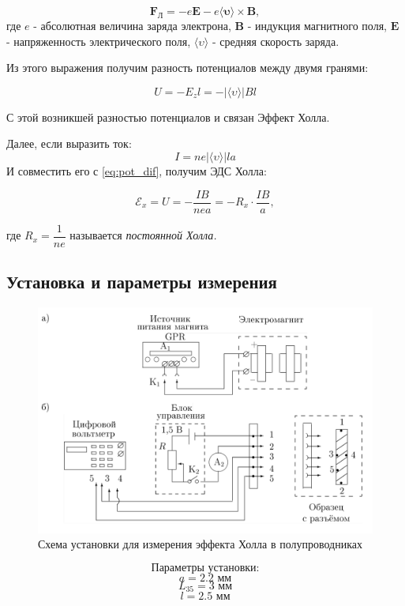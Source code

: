 \documentclass[a4paper, 12pt]{article}
\begin{document}
$$\boldsymbol{F_\text{Л}}  = -e \boldsymbol{E} - e \langle \boldsymbol{\upsilon} \rangle \times \boldsymbol{B},$$
где $e$ - абсолютная величина заряда электрона, $\boldsymbol{B}$ - индукция магнитного поля, $\boldsymbol{E}$ - напряженность электрического поля, $ \langle \upsilon \rangle$ - средняя скорость заряда.

Из этого выражения получим разность потенциалов между двумя гранями:

\begin{equation}
U = -E_zl = - | \langle \upsilon \rangle | B l
\label{eq:pot_dif}
\end{equation}

С этой возникшей разностью потенциалов и связан Эффект Холла.

Далее, если выразить ток:
$$ I = ne |\langle \upsilon \rangle |  l a$$
И совместить его с \ref{eq:pot_dif}, получим ЭДС Холла:

\begin{equation}
\mathscr{E}_x = U = - \dfrac{IB}{nea} = -R_x \cdot \dfrac{IB}{a},
\label{eq: Hall}
\end{equation}

где $R_x = \dfrac{1}{ne}$ называется \textit{постоянной Холла.}

\subsection*{Установка и параметры измерения}

\begin{figure}
\includegraphics[width = 0.7 \textwidth]{Scheme1}
			\caption{Схема установки для измерения эффекта Холла в полупроводниках}
\end{figure} 

		$$\text{Параметры установки:}$$
$$a = 2.2 \text{ мм}$$
$$L_{35} = 3 \text{ мм}$$
$$l = 2.5 \text{ мм}$$
\vspace{5 cm}
\end{document}
